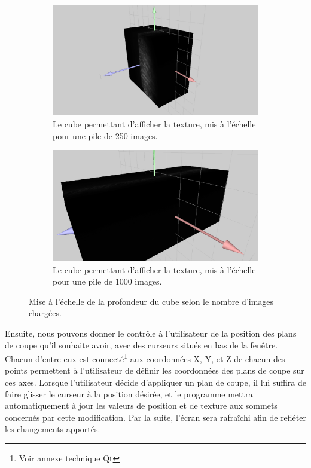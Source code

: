 {{        \begin{figure}[!h]
            \begin{subfigure}{.49\linewidth}
                \centering
                \includegraphics[width=.9\linewidth]{img/cube1.png}
                \captionsetup{width=.9\linewidth}
                \caption{Le cube permettant d'afficher la texture, mis à l'échelle pour une pile de 250 images.}
                \label{img:cube1}
            \end{subfigure}
            \hfill
            \begin{subfigure}{.49\linewidth}
                \centering
                \includegraphics[width=.9\linewidth]{img/cube2.png}
                \captionsetup{width=.9\linewidth}
                \caption{Le cube permettant d'afficher la texture, mis à l'échelle pour une pile de 1000 images.}
                \label{img:cube2}
            \end{subfigure}
            \caption{Mise à l'échelle de la profondeur du cube selon le nombre d'images chargées.}
            \label{img:cubes}
        \end{figure}

		Ensuite, nous pouvons donner le contrôle à l'utilisateur de la position des plans de coupe qu'il souhaite avoir, avec des curseurs situés en bas de la fenêtre. Chacun d'entre eux est connecté\footnote{Voir annexe technique Qt} aux coordonnées X, Y, et Z de chacun des points permettent à l'utilisateur de définir les coordonnées des plans de coupe sur ces axes. Lorsque l'utilisateur décide d'appliquer un plan de coupe, il lui suffira de faire glisser le curseur à la position désirée, et le programme mettra automatiquement à jour les valeurs de position et de texture aux sommets concernés par cette modification. Par la suite, l'écran sera rafraîchi afin de refléter les changements apportés.

}}
